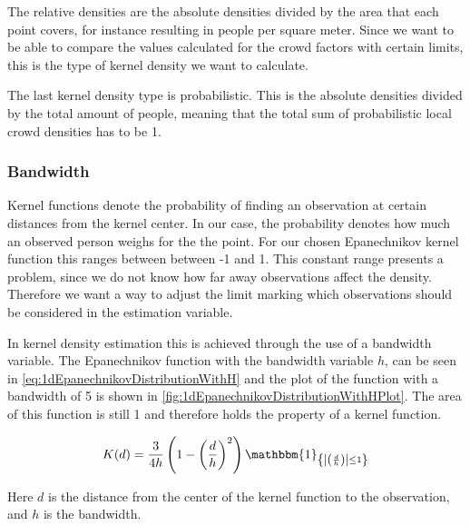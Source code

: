 The relative densities are the absolute densities divided by the area that each point covers, for instance resulting in people per square meter. Since we want to be able to compare the values calculated for the crowd factors with certain limits, this is the type of kernel density we want to calculate.

The last kernel density type is probabilistic. This is the absolute densities divided by the total amount of people, meaning that the total sum of probabilistic local crowd densities has to be 1.

\subsubsection{Bandwidth}

Kernel functions denote the probability of finding an observation at certain distances from the kernel center. In our case, the probability denotes how much an observed person weighs for the the point. For our chosen Epanechnikov kernel function this ranges between between -1 and 1. 
This constant range presents a problem, since we do not know how far away observations affect the density. Therefore we want a way to adjust the limit marking which observations should be considered in the estimation variable.

In kernel density estimation this is achieved through the use of a bandwidth variable. The Epanechnikov function with the bandwidth variable $h$, can be seen in \cref{eq:1dEpanechnikovDistributionWithH} and the plot of the function with a bandwidth of 5 is shown in \cref{fig:1dEpanechnikovDistributionWithHPlot}. The area of this function is still 1 and therefore holds the property of a kernel function.

\begin{equation}
\label{eq:1dEpanechnikovDistributionWithH}
K(d) = \frac{3}{4 h} \left( 1-\left(\frac{d}{h}\right)^2 \right) \mathbbm{1}_{\left\{\left|\left(\frac{d}{h}\right)\right| \leq 1\right\}}
\end{equation}

Here $d$ is the distance from the center of the kernel function to the observation, and $h$ is the bandwidth.

